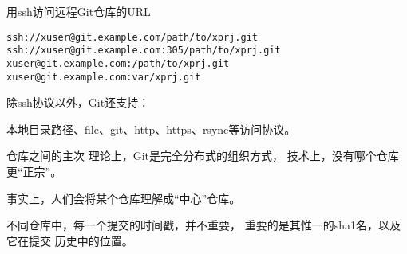 \begin{frame}[<+->][fragile]{用ssh访问远程Git仓库的URL}
    \begin{Verbatim}[frame=single,commandchars=\\\{\}]
ssh://xuser@git.example.com/path/to/xprj.git
ssh://xuser@git.example.com:305/path/to/xprj.git
xuser@git.example.com:/path/to/xprj.git
xuser@git.example.com:var/xprj.git
    \end{Verbatim}

    \bigskip
    除ssh协议以外，Git还支持：
    
    本地目录路径、file、git、http、https、rsync等访问协议。
\end{frame}


\begin{frame}[<+->][fragile]{仓库之间的主次}
\onslide<+->
理论上，Git是完全分布式的组织方式，
技术上，没有哪个仓库更“正宗”。

\bigskip
\onslide<+->
事实上，人们会将某个仓库理解成“中心”仓库。

\bigskip
\onslide<+->
不同仓库中，每一个提交的时间戳，并不重要，
重要的是其惟一的sha1名，以及它在提交
历史中的位置。
\end{frame}
